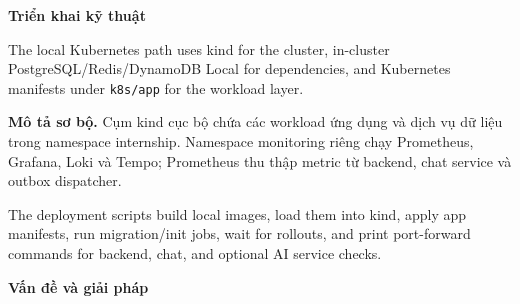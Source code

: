 \vspace{0.5em}\noindent\textbf{Triển khai kỹ
thuật}\par

The local Kubernetes path uses kind for the cluster, in-cluster
PostgreSQL/Redis/DynamoDB Local for dependencies, and Kubernetes
manifests under \texttt{k8s/\allowbreak{}app} for the workload layer.

\textbf{Mô tả sơ bộ.} Cụm kind cục bộ chứa các workload ứng dụng và dịch
vụ dữ liệu trong namespace internship. Namespace monitoring riêng chạy
Prometheus, Grafana, Loki và Tempo; Prometheus thu thập metric từ
backend, chat service và outbox dispatcher.

The deployment scripts build local images, load them into kind, apply
app manifests, run migration/init jobs, wait for rollouts, and print
port-forward commands for backend, chat, and optional AI service checks.

\vspace{0.5em}\noindent\textbf{Vấn đề và giải
pháp}\par

